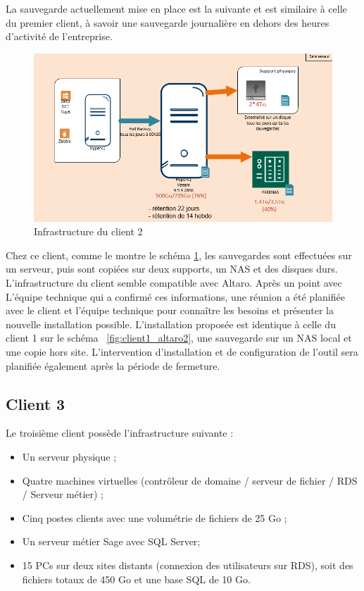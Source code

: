 \documentclass[pfe]{tnreport} %
\begin{document}
La sauvegarde actuellement mise en place est la suivante et est similaire à celle du premier client, à savoir une sauvegarde journalière en dehors des heures d'activité de l'entreprise. 
\begin{figure}[ht]
 \centering
 \includegraphics[width=15cm]{figures/client2.png}
 \caption{Infrastructure du client 2}
 \label{fig:client2}
\end{figure}
Chez ce client, comme le montre le schéma \ref{fig:client2}, les sauvegardes sont effectuées sur un serveur, puis sont copiées sur deux supports, un NAS et des disques durs. \newline
L'infrastructure du client semble compatible avec Altaro. Après un point avec L'équipe technique qui a confirmé ces informations, une réunion a été planifiée avec le client et l'équipe technique pour connaître les besoins et présenter la nouvelle installation possible. \newline
L'installation proposée est identique à celle du client 1 sur le schéma ~\ref{fig:client1_altaro2}, une sauvegarde sur un NAS local et une copie hors site. \newline
L'intervention d'installation et de configuration de l'outil sera planifiée également après la période de fermeture.
\subsection{Client 3}

Le troisième client possède l'infrastructure suivante : \newline
\begin{itemize}
 \item Un serveur physique ; 
 \item Quatre machines virtuelles (contrôleur de domaine / serveur de fichier / RDS / Serveur métier) ;
\item Cinq postes clients avec une volumétrie de fichiers de 25 Go ;
\item Un serveur métier Sage avec SQL Server;
\item 15 PCs sur deux sites distants (connexion des utilisateurs sur RDS), soit des fichiers totaux de 450 Go et une base SQL de 10 Go.\newline
\end{itemize}
\end{document}
